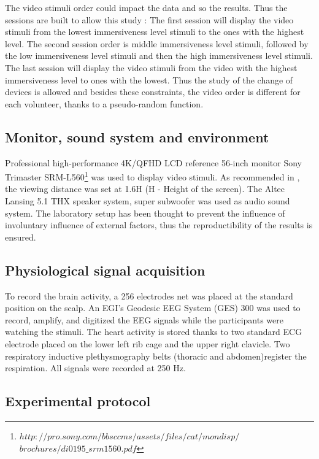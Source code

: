 The video stimuli order could impact the data and so the results. Thus the sessions are built to allow this study : The first session will display the video stimuli from the lowest immersiveness level stimuli to the ones with the highest level. The second session order is middle immersiveness level stimuli, followed by the low immersiveness level stimuli and then the high immersiveness level stimuli. The last session will display the video stimuli from the video with the highest immersiveness level to ones with the lowest.
Thus the study of the change of devices is allowed and besides these constraints, the video order is different for each volunteer, thanks to a pseudo-random function. 

\subsection{Monitor, sound system and environment}

Professional high-performance 4K/QFHD LCD reference 56-inch monitor Sony Trimaster SRM-L560\footnote{$http://pro.sony.com/bbsccms/assets/files/cat/mondisp/$ \newline $brochures/di0195\_srm1560.pdf$} was used to display video stimuli.
As recommended in \cite{ScreenD}, the viewing distance was set at 1.6H (H - Height of the screen).
The Altec Lansing 5.1 THX speaker system, super subwoofer was used as audio sound system.
The laboratory setup has been thought to prevent the influence of involuntary influence of external factors, thus the reproductibility of the results is ensured.

\subsection{Physiological signal acquisition}

To record the brain activity, a 256 electrodes net was placed at the standard position on the scalp. An EGI's Geodesic EEG System (GES) 300 was used to record, amplify, and digitized the EEG signals while the participants were watching the stimuli. The heart activity is stored thanks to two standard \ac{ECG} electrode placed on the lower left rib cage and the upper right clavicle. Two respiratory inductive plethysmography belts (thoracic and abdomen)register the respiration. All signals were recorded at 250 Hz.

\subsection{Experimental protocol}

